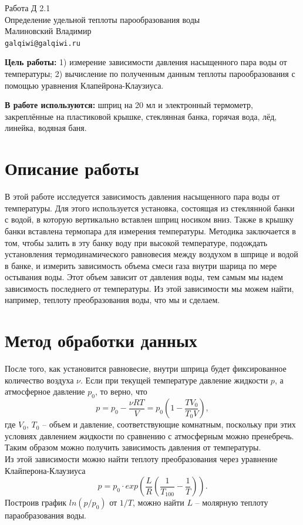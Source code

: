 
\usepackage{booktabs}
\usepackage{multirow}



\begin{center}
  \LARGE{Работа Д 2.1}\\[0.2cm]
  \LARGE{Определение удельной теплоты парообразования воды}\\[0.2cm]
  \large{Малиновский Владимир}\\[0.2cm]
  \normalsize{\texttt{galqiwi@galqiwi.ru}}
\end{center}

\textbf{Цель работы:} 1) измерение зависимости давления насыщенного пара воды от температуры; 2) вычисление по полученным данным теплоты парообразования с помощью уравнения Клапейрона-Клаузиуса.

\textbf{В работе используются:} шприц на 20 мл и электронный термометр, закреплённые на пластиковой крышке, стеклянная банка, горячая вода, лёд, линейка, водяная баня.

\section*{Описание работы}
В этой работе исследуется зависимость давления насыщенного пара воды от температуры. Для этого используется установка, состоящая из стеклянной банки с водой, в которую вертикально вставлен шприц носиком вниз. Также в крышку банки вставлена термопара для измерения температуры. Методика заключается в том, чтобы залить в эту банку воду при высокой температуре, подождать установления термодинамического равновесия между воздухом в шприце и водой в банке, и измерить зависимость объема смеси газа внутри шарица по мере остывания воды. Этот объем зависит от давления воды, тем самым мы надем зависимость последнего от температуры. Из этой зависимости мы можем найти, например, теплоту преобразования воды, что мы и сделаем.
\section*{Метод обработки данных}
После того, как установится равновесие, внутри шприца будет фиксированное количество воздуха $\nu$. Если при текущей температуре давление жидкости $p$, а атмосферное давление $p_0$, то верно, что
$$p = p_0 - \frac{\nu R T}{V} = p_0 (1 - \frac{T V_0}{T_0 V}),$$
где $V_0$, $T_0$ -- объем и давление, соответствующие комнатным, поскольку при этих условиях давлением жидкости по сравнению с атмосферным можно пренебречь. Таким образом можно получить зависимость давления от температуры.\\
Из этой зависимости можно найти теплоту преобразования через уравнение Клайперона-Клаузиуса
$$p = p_0 \cdot exp\left(\frac{L}{R}\left(\frac{1}{T_{100}} - \frac{1}{T}\right)\right).$$
Построив график $ln(p/p_0)$ от $1/T$, можно найти $L$ -- молярную теплоту параобразования воды.
\newpage
